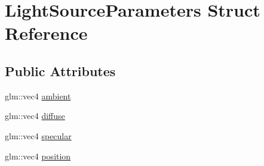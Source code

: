 \hypertarget{structLightSourceParameters}{\section{Light\-Source\-Parameters Struct Reference}
\label{structLightSourceParameters}
}
\subsection*{Public Attributes}
\begin{DoxyCompactItemize}
\item 
glm\-::vec4 \hyperlink{structLightSourceParameters_a9bf58f5dda9d0cacf29e3a09967f2f69}{ambient}
\item 
glm\-::vec4 \hyperlink{structLightSourceParameters_af305c134edfd9b808d4daae1f6d4f350}{diffuse}
\item 
glm\-::vec4 \hyperlink{structLightSourceParameters_aac591da2e5f4e3639e376692d36c06de}{specular}
\item 
glm\-::vec4 \hyperlink{structLightSourceParameters_ac4f0e6f4af0349c409ac33492b1960a7}{position}
\end{DoxyCompactItemize}


